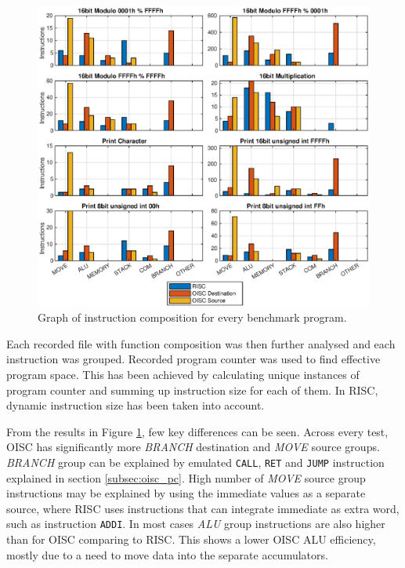 \begin{figure}[t]
	\centering
	\includegraphics[width=\linewidth]{../tests/instr_comp.eps}
	\caption{Graph of instruction composition for every benchmark program.}
	\label{fig:instr_comp}
\end{figure}


Each recorded file with function composition was then further analysed and each instruction was grouped. Recorded program counter was used to find effective program space. This has been achieved by calculating unique instances of program counter and summing up instruction size for each of them. In RISC, dynamic instruction size has been taken into account. 

From the results in Figure \ref{fig:instr_comp}, few key differences can be seen. Across every test, OISC has significantly more \textit{BRANCH} destination and \textit{MOVE} source groups. \textit{BRANCH} group can be explained by emulated \texttt{CALL}, \texttt{RET} and \texttt{JUMP} instruction explained in section \ref{subsec:oisc_pc}.
High number of \textit{MOVE} source group instructions may be explained by using the immediate values as a separate source, where RISC uses instructions that can integrate immediate as extra word, such as instruction \texttt{ADDI}. In most cases \textit{ALU} group instructions are also higher than for OISC comparing to RISC. This shows a lower OISC ALU efficiency, mostly due to a need to move data into the separate accumulators.

